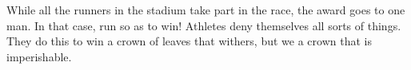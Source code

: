 \lettrine[lines=3]{W}{}hile all the runners in the stadium take part in the race, the award goes to one man. In that case, run so as to win! Athletes deny themselves all sorts of things. They do this to win a crown of leaves that withers, but we a crown that is imperishable.
